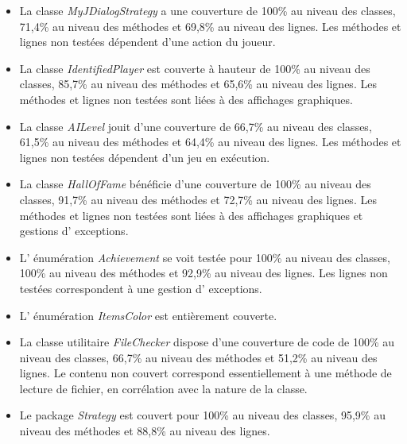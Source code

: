 \documentclass[12pt, openany]{report}
\begin{document}
\begin{itemize}
	\item La classe \mbox{\textit{MyJDialogStrategy}} a une couverture de 100\% au niveau des classes, 71,4\% au niveau des méthodes et 69,8\% au niveau des lignes. Les méthodes et lignes non testées dépendent d'une action du joueur.
	\item La classe \mbox{\textit{IdentifiedPlayer}} est couverte à hauteur de 100\% au niveau des classes, 85,7\% au niveau des méthodes et 65,6\% au niveau des lignes. Les méthodes et lignes non testées sont liées à des affichages graphiques.
	\item La classe \mbox{\textit{AILevel}} jouit d'une couverture de 66,7\% au niveau des classes, 61,5\% au niveau des méthodes et 64,4\% au niveau des lignes. Les méthodes et lignes non testées dépendent d'un jeu en exécution.
	\item La classe \mbox{\textit{HallOfFame}} bénéficie d'une couverture de 100\% au niveau des classes, 91,7\% au niveau des méthodes et 72,7\% au niveau des lignes. Les méthodes et lignes non testées sont liées à des affichages graphiques et gestions d' exceptions.
	\item L' énumération \mbox{\textit{Achievement}} se voit testée pour 100\% au niveau des classes, 100\% au niveau des méthodes et 92,9\% au niveau des lignes. Les lignes non testées correspondent à une gestion d' exceptions.
	\item L' énumération \mbox{\textit{ItemsColor}} est entièrement couverte.
	\item La classe utilitaire \mbox{\textit{FileChecker}} dispose d'une couverture de code de 100\% au niveau des classes, 66,7\% au niveau des méthodes et 51,2\% au niveau des lignes. Le contenu non couvert correspond essentiellement à une méthode de lecture de fichier, en corrélation avec la nature de la classe.
	\item Le package \mbox{\textit{Strategy}} est couvert pour 100\% au niveau des classes, 95,9\% au niveau des méthodes et 88,8\% au niveau des lignes.\\ 
	

\end{itemize}
\end{document}
